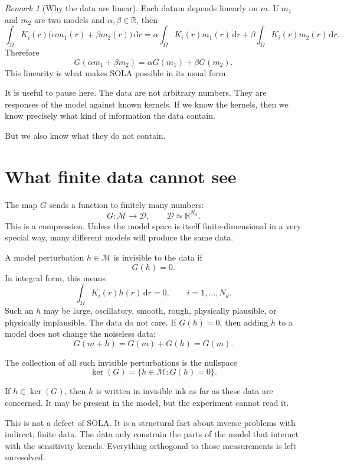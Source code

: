 \documentclass[11pt,openany]{book}
\theoremstyle{definition}
\theoremstyle{remark}
\newtheorem{remark}{Remark}[chapter]
\newcommand{\M}{\mathcal M}
\newcommand{\D}{\mathcal D}
\newcommand{\dd}{\,\mathrm d}
\newcommand{\kernel}{\operatorname{ker}}
\begin{document}
\begin{remark}[Why the data are linear]
Each datum depends linearly on \(m\). If \(m_1\) and \(m_2\) are two models and
\(\alpha,\beta\in\mathbb R\), then
\[
  \int_\Omega K_i(r)\bigl(\alpha m_1(r)+\beta m_2(r)\bigr)\dd r
  =
  \alpha\int_\Omega K_i(r)m_1(r)\dd r
  +
  \beta\int_\Omega K_i(r)m_2(r)\dd r.
\]
Therefore
\[
  G(\alpha m_1+\beta m_2)=\alpha G(m_1)+\beta G(m_2).
\]
This linearity is what makes SOLA possible in its usual form.
\end{remark}

It is useful to pause here. The data are not arbitrary numbers. They are responses of the model
against known kernels. If we know the kernels, then we know precisely what kind of information
the data contain.

But we also know what they do not contain.

\section{What finite data cannot see}

The map \(G\) sends a function to finitely many numbers:
\[
  G:\M\to\D,
  \qquad
  \D\simeq\mathbb R^{N_d}.
\]
This is a compression. Unless the model space is itself finite-dimensional in a very special way,
many different models will produce the same data.

A model perturbation \(h\in\M\) is invisible to the data if
\[
  G(h)=0.
\]
In integral form, this means
\[
  \int_\Omega K_i(r)h(r)\dd r=0,
  \qquad i=1,\dots,N_d.
\]
Such an \(h\) may be large, oscillatory, smooth, rough, physically plausible, or physically
implausible. The data do not care. If \(G(h)=0\), then adding \(h\) to a model does not change
the noiseless data:
\[
  G(m+h)=G(m)+G(h)=G(m).
\]

The collection of all such invisible perturbations is the nullspace
\[
  \kernel(G)
  =
  \{h\in\M:G(h)=0\}.
\]

\begin{intuitionbox}
If \(h\in\kernel(G)\), then \(h\) is written in invisible ink as far as these data are concerned.
It may be present in the model, but the experiment cannot read it.
\end{intuitionbox}

This is not a defect of SOLA. It is a structural fact about inverse problems with indirect,
finite data. The data only constrain the parts of the model that interact with the sensitivity
kernels. Everything orthogonal to those measurements is left unresolved.
\end{document}
